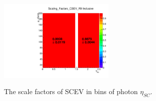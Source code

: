 		
		\begin{figure}[!ht]
		  \centering
		  \includegraphics[width=0.5\textwidth]{Fig/PhoMVAIDSF/h_Scaling_Factors_CSEV_R9Inc}\\
		  \caption{The scale factors of SCEV in bins of photon $\eta_{SC}$.}
		  \label{fig:PhotonElevetoSFs}
		\end{figure}
		
